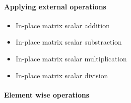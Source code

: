 \paragraph{Applying external operations}
\begin{itemize}
\item {}
  \sshortdescribe In-place matrix scalar addition  

\item {}
  \sshortdescribe In-place matrix scalar substraction  

\item {}
  \sshortdescribe In-place matrix scalar multiplication  

\item {}
  \sshortdescribe In-place matrix scalar division  

\end{itemize}

\paragraph{Element wise operations}

